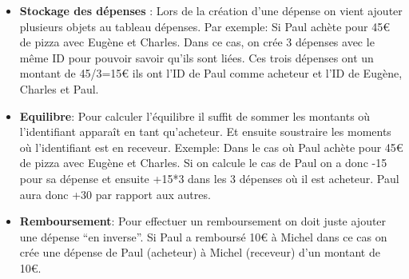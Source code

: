 \documentclass[12,french]{report}
\begin{document}
\begin{itemize}[label=\textbullet]
\item \textbf{Stockage des dépenses} : Lors de la création d’une dépense on vient ajouter plusieurs objets au tableau dépenses. Par exemple:
Si Paul achète pour 45€ de pizza avec Eugène et Charles.
Dans ce cas, on crée 3 dépenses avec le même ID pour pouvoir savoir qu’ils sont liées. Ces trois dépenses ont un montant de 45/3=15€ ils ont l’ID de Paul comme acheteur et l’ID de Eugène, Charles et Paul.\\

\item \textbf{Equilibre}:
Pour calculer l’équilibre il suffit de sommer les montants où l’identifiant apparaît en tant qu’acheteur. Et ensuite soustraire les moments où l’identifiant est en receveur.
Exemple: Dans le cas où Paul achète pour 45€ de pizza avec Eugène et Charles. Si on calcule le cas de Paul on a donc -15 pour sa dépense et ensuite +15*3 dans les 3 dépenses où il est acheteur. Paul aura donc +30 par rapport aux autres.

\item \textbf{Remboursement}:
Pour effectuer un remboursement on doit juste ajouter une dépense “en inverse”. Si Paul a remboursé 10€ à Michel dans ce cas on crée une dépense de Paul (acheteur) à Michel (receveur) d’un montant de 10€.

\end{itemize}
\end{document}
